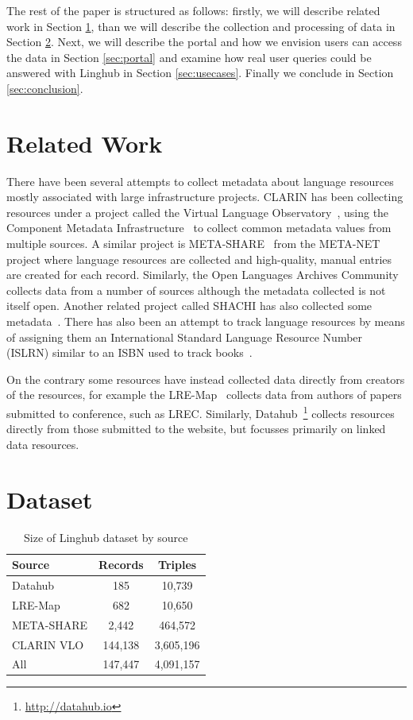 \documentclass{acm_proc_article-sp}
\begin{document}
The rest of the paper is structured as follows: firstly, we will describe
related work in Section \ref{sec:related}, than we will describe the collection
and processing of data in Section \ref{sec:dataset}. Next, we will describe the
portal and how we envision users can access the data in Section \ref{sec:portal}
and examine how real user queries could be answered with Linghub in Section
\ref{sec:usecases}. Finally we conclude in Section \ref{sec:conclusion}.

\section{Related Work}
\label{sec:related}

There have been several attempts to collect metadata about language resources
mostly associated with large infrastructure projects. CLARIN has been collecting
resources under a project called the Virtual Language
Observatory~\cite{van2012semantic}, using the Component
Metadata Infrastructure~\cite[CMDI]{broeder2012cmdi} to collect common metadata
values from multiple sources. A similar project is
META-SHARE~\cite{piperidis2012meta} from the META-NET project where language
resources are collected and high-quality, manual entries are created for each
record. Similarly, the Open Languages Archives
Community~\cite[OLAC]{bird2003extending} collects data from a number of sources
although the metadata collected is not itself open. Another related project called
SHACHI has also collected some metadata~\cite{tohyama2008shachi}. There has also
been an attempt to track language resources by means of assigning them an
International Standard Language Resource Number (ISLRN) similar to an ISBN used
to track books~\cite{choukri2012using}.

On the contrary some resources have instead collected data directly from
creators of the resources, for example the LRE-Map~\cite{calzolari2012lre} collects data from
authors of papers submitted to conference, such as LREC. Similarly,
Datahub~\footnote{\url{http://datahub.io}} collects resources directly from
those submitted to the website, but focusses primarily on linked data resources.

\section{Dataset}
\label{sec:dataset}

\begin{table}
	\centering
	\begin{tabular}{p{30mm}|cc}
	Source               & Records    & Triples  \\
	\hline
	Datahub              & 185        & 10,739   \\
	LRE-Map              & 682        & 10,650   \\
	META-SHARE           & 2,442      & 464,572  \\
	CLARIN VLO           & 144,138    & 3,605,196\\
	\hline
	All                  & 147,447    & 4,091,157\\
	\end{tabular}
	\caption{Size of Linghub dataset by source\label{tab:size}}
\end{table}
\end{document}
